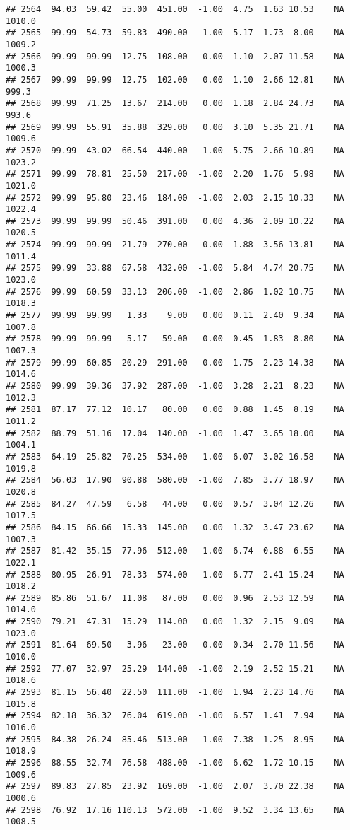 \documentclass{article}\usepackage{graphicx, color}
\makeatletter
\newenvironment{kframe}{%
 \def\at@end@of@kframe{}%
 \ifinner\ifhmode%
  \def\at@end@of@kframe{\end{minipage}}%
  \begin{minipage}{\columnwidth}%
 \fi\fi%
 \def\FrameCommand##1{\hskip\@totalleftmargin \hskip-\fboxsep
 \colorbox{shadecolor}{##1}\hskip-\fboxsep
     \hskip-\linewidth \hskip-\@totalleftmargin \hskip\columnwidth}%
 \MakeFramed {\advance\hsize-\width
   \@totalleftmargin\z@ \linewidth\hsize
   \@setminipage}}%
 {\par\unskip\endMakeFramed%
 \at@end@of@kframe}
\newenvironment{knitrout}{}{} %
\makeatother
\begin{document}
\begin{knitrout}
\begin{kframe}
\begin{verbatim}
## 2564  94.03  59.42  55.00  451.00  -1.00  4.75  1.63 10.53    NA 1010.0
## 2565  99.99  54.73  59.83  490.00  -1.00  5.17  1.73  8.00    NA 1009.2
## 2566  99.99  99.99  12.75  108.00   0.00  1.10  2.07 11.58    NA 1000.3
## 2567  99.99  99.99  12.75  102.00   0.00  1.10  2.66 12.81    NA  999.3
## 2568  99.99  71.25  13.67  214.00   0.00  1.18  2.84 24.73    NA  993.6
## 2569  99.99  55.91  35.88  329.00   0.00  3.10  5.35 21.71    NA 1009.6
## 2570  99.99  43.02  66.54  440.00  -1.00  5.75  2.66 10.89    NA 1023.2
## 2571  99.99  78.81  25.50  217.00  -1.00  2.20  1.76  5.98    NA 1021.0
## 2572  99.99  95.80  23.46  184.00  -1.00  2.03  2.15 10.33    NA 1022.4
## 2573  99.99  99.99  50.46  391.00   0.00  4.36  2.09 10.22    NA 1020.5
## 2574  99.99  99.99  21.79  270.00   0.00  1.88  3.56 13.81    NA 1011.4
## 2575  99.99  33.88  67.58  432.00  -1.00  5.84  4.74 20.75    NA 1023.0
## 2576  99.99  60.59  33.13  206.00  -1.00  2.86  1.02 10.75    NA 1018.3
## 2577  99.99  99.99   1.33    9.00   0.00  0.11  2.40  9.34    NA 1007.8
## 2578  99.99  99.99   5.17   59.00   0.00  0.45  1.83  8.80    NA 1007.3
## 2579  99.99  60.85  20.29  291.00   0.00  1.75  2.23 14.38    NA 1014.6
## 2580  99.99  39.36  37.92  287.00  -1.00  3.28  2.21  8.23    NA 1012.3
## 2581  87.17  77.12  10.17   80.00   0.00  0.88  1.45  8.19    NA 1011.2
## 2582  88.79  51.16  17.04  140.00  -1.00  1.47  3.65 18.00    NA 1004.1
## 2583  64.19  25.82  70.25  534.00  -1.00  6.07  3.02 16.58    NA 1019.8
## 2584  56.03  17.90  90.88  580.00  -1.00  7.85  3.77 18.97    NA 1020.8
## 2585  84.27  47.59   6.58   44.00   0.00  0.57  3.04 12.26    NA 1017.5
## 2586  84.15  66.66  15.33  145.00   0.00  1.32  3.47 23.62    NA 1007.3
## 2587  81.42  35.15  77.96  512.00  -1.00  6.74  0.88  6.55    NA 1022.1
## 2588  80.95  26.91  78.33  574.00  -1.00  6.77  2.41 15.24    NA 1018.2
## 2589  85.86  51.67  11.08   87.00   0.00  0.96  2.53 12.59    NA 1014.0
## 2590  79.21  47.31  15.29  114.00   0.00  1.32  2.15  9.09    NA 1023.0
## 2591  81.64  69.50   3.96   23.00   0.00  0.34  2.70 11.56    NA 1010.0
## 2592  77.07  32.97  25.29  144.00  -1.00  2.19  2.52 15.21    NA 1018.6
## 2593  81.15  56.40  22.50  111.00  -1.00  1.94  2.23 14.76    NA 1015.8
## 2594  82.18  36.32  76.04  619.00  -1.00  6.57  1.41  7.94    NA 1016.0
## 2595  84.38  26.24  85.46  513.00  -1.00  7.38  1.25  8.95    NA 1018.9
## 2596  88.55  32.74  76.58  488.00  -1.00  6.62  1.72 10.15    NA 1009.6
## 2597  89.83  27.85  23.92  169.00  -1.00  2.07  3.70 22.38    NA 1000.6
## 2598  76.92  17.16 110.13  572.00  -1.00  9.52  3.34 13.65    NA 1008.5

\end{verbatim}
\end{kframe}
\end{knitrout}
\end{document}
